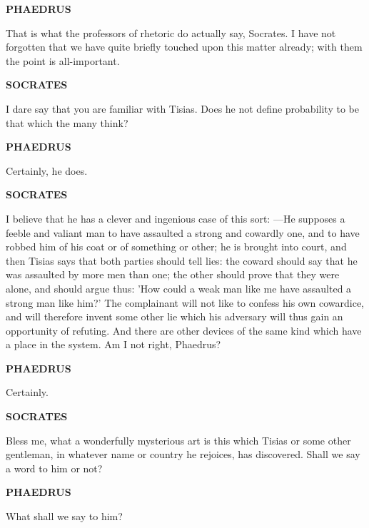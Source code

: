 \documentclass[11pt,letter]{article}
\begin{document}
\par \textbf{PHAEDRUS}
\par   That is what the professors of rhetoric do actually say, Socrates. I have not forgotten that we have quite briefly touched upon this matter already; with them the point is all-important.

\par \textbf{SOCRATES}
\par   I dare say that you are familiar with Tisias. Does he not define probability to be that which the many think?

\par \textbf{PHAEDRUS}
\par   Certainly, he does.

\par \textbf{SOCRATES}
\par   I believe that he has a clever and ingenious case of this sort: —He supposes a feeble and valiant man to have assaulted a strong and cowardly one, and to have robbed him of his coat or of something or other; he is brought into court, and then Tisias says that both parties should tell lies:  the coward should say that he was assaulted by more men than one; the other should prove that they were alone, and should argue thus:  'How could a weak man like me have assaulted a strong man like him?' The complainant will not like to confess his own cowardice, and will therefore invent some other lie which his adversary will thus gain an opportunity of refuting. And there are other devices of the same kind which have a place in the system. Am I not right, Phaedrus?

\par \textbf{PHAEDRUS}
\par   Certainly.

\par \textbf{SOCRATES}
\par   Bless me, what a wonderfully mysterious art is this which Tisias or some other gentleman, in whatever name or country he rejoices, has discovered. Shall we say a word to him or not?

\par \textbf{PHAEDRUS}
\par   What shall we say to him?
\end{document}
